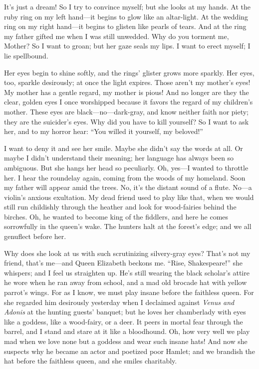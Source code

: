 \documentclass[12pt,a4paper]{article}
\begin{document}
It’s just a dream! So I try to convince myself; but she looks at my hands. At the ruby ring on my left hand—it begins to glow like an altar-light. At the wedding ring on my right hand—it begins to glisten like pearls of tears. And at the ring my father gifted me when I was still unwedded. Why do you torment me, Mother? So I want to groan; but her gaze seals my lips. I want to erect myself; I lie spellbound.

Her eyes begin to shine softly, and the rings’ glister grows more sparkly. Her eyes, too, sparkle desirously; at once the light expires. Those aren’t my mother’s eyes! My mother has a gentle regard, my mother is pious! And no longer are they the clear, golden eyes I once worshipped because it favors the regard of my children’s mother. These eyes are black—no—dark-gray, and know neither faith nor piety; they are the suicider’s eyes. Why did you have to kill yourself? So I want to ask her, and to my horror hear: “You willed it yourself, my beloved!”

I want to deny it and see her smile. Maybe she didn’t say the words at all. Or maybe I didn’t understand their meaning; her language has always been so ambiguous. But she hangs her head so peculiarly. Oh, yes—I wanted to throttle her. I hear the roundelay again, coming from the woods of my homeland. Soon my father will appear amid the trees. No, it’s the distant sound of a flute. No—a violin’s anxious exultation. My dead friend used to play like that, when we would still run childishly through the heather and look for wood-fairies behind the birches. Oh, he wanted to become king of the fiddlers, and here he comes sorrowfully in the queen’s wake. The hunters halt at the forest’s edge; and we all genuflect before her.

Why does she look at us with such scrutinizing silvery-gray eyes? That’s not my friend, that’s me—and Queen Elizabeth beckons me. “Rise, Shakespeare!” she whispers; and I feel us straighten up. He’s still wearing the black scholar’s attire he wore when he ran away from school, and a mad old brocade hat with yellow parrot’s wings. For as I know, we must play insane before the faithless queen. For she regarded him desirously yesterday when I declaimed against \textit{Venus and Adonis} at the hunting guests’ banquet; but he loves her chamberlady with eyes like a goddess, like a wood-fairy, or a deer. It peers in mortal fear through the barrel, and I stand and stare at it like a bloodhound. Oh, how very well we play mad when we love none but a goddess and wear such insane hats! And now she suspects why he became an actor and poetized poor Hamlet; and we brandish the hat before the faithless queen, and she smiles charitably.
\end{document}
